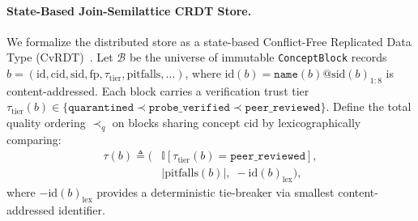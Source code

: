 \documentclass[10pt,twocolumn]{article}
\begin{document}
\paragraph{State-Based Join-Semilattice CRDT Store.}
We formalize the distributed store as a state-based Conflict-Free Replicated Data Type (CvRDT)~\cite{shapiro2011crdt}. Let $\mathcal{B}$ be the universe of immutable \texttt{ConceptBlock} records $b = (\text{id}, \text{cid}, \text{sid}, \text{fp}, \tau_{\text{tier}}, \text{pitfalls}, \dots)$, where $\text{id}(b) = \texttt{name}(b)\texttt{@}\text{sid}(b)_{1:8}$ is content-addressed. Each block carries a verification trust tier $\tau_{\text{tier}}(b) \in \{\texttt{quarantined} \prec \texttt{probe\_verified} \prec \texttt{peer\_reviewed}\}$. Define the total quality ordering $\prec_q$ on blocks sharing concept $\text{cid}$ by lexicographically comparing:
\begin{equation}
\begin{aligned}
    \tau(b) \triangleq \Big(&\mathbb{I}[\tau_{\text{tier}}(b) = \texttt{peer\_reviewed}], \\
    &|\text{pitfalls}(b)|,\; -\text{id}(b)_{\text{lex}}\Big),
\end{aligned}
\end{equation}
where $-\text{id}(b)_{\text{lex}}$ provides a deterministic tie-breaker via smallest content-addressed identifier.
\end{document}
